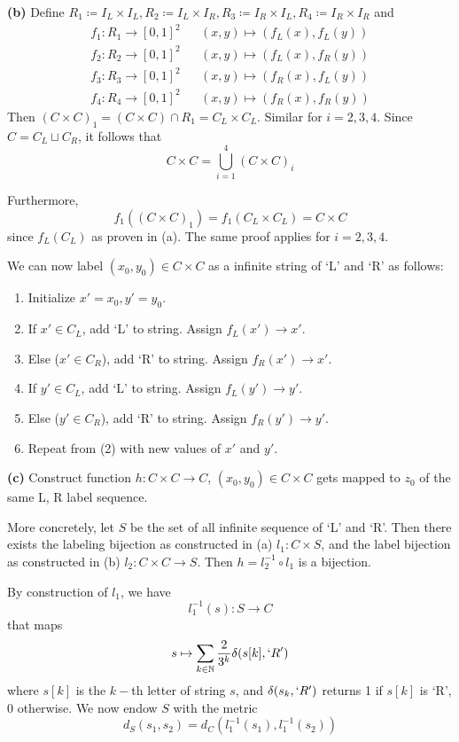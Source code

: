 \documentclass[a4paper, 12pt]{article}
\begin{document}
\begin{solution}
    \textbf{(b)} Define $R_1 \coloneqq I_L \times I_L, R_2 \coloneqq I_L \times I_R, R_3 \coloneqq I_R \times I_L, R_4 \coloneqq I_R \times I_R$ and
    \[
        \begin{aligned}
            f_1: R_1 \to [0, 1]^2 &  & (x, y) \mapsto (f_L(x), f_L(y)) \\
            f_2: R_2 \to [0, 1]^2 &  & (x, y) \mapsto (f_L(x), f_R(y)) \\
            f_3: R_3 \to [0, 1]^2 &  & (x, y) \mapsto (f_R(x), f_L(y)) \\
            f_4: R_4 \to [0, 1]^2 &  & (x, y) \mapsto (f_R(x), f_R(y))
        \end{aligned}
    \]
    Then $(C \times C)_1 = (C \times C) \cap R_1 = C_L \times C_L$. Similar for $i = 2, 3, 4$. Since $C = C_L \sqcup C_R$, it follows that \[
        C \times C = \bigcup_{i=1}^4 (C \times C)_i
    \]

    Furthermore, \[
        f_1 ((C \times C)_1) = f_1 (C_L \times C_L) = C \times C
    \]
    since $f_L(C_L)$ as proven in (a). The same proof applies for $i = 2, 3, 4$.

    We can now label $(x_0, y_0) \in C \times C$ as a infinite string of `L' and `R' as follows:
    \begin{enumerate}
        \item Initialize $x' = x_0, y' = y_0$.
        \item If $x' \in C_L$, add `L' to string. Assign $f_L(x') \to x'$.
        \item Else ($x' \in C_R$), add `R' to string. Assign $f_R(x') \to x'$.
        \item If $y' \in C_L$, add `L' to string. Assign $f_L(y') \to y'$.
        \item Else ($y' \in C_R$), add `R' to string. Assign $f_R(y') \to y'$.
        \item Repeat from (2) with new values of $x'$ and $y'$.
    \end{enumerate}

    \textbf{(c)} Construct function $h: C \times C \to C$, $(x_0, y_0) \in C \times C$ gets mapped to $z_0$ of the same L, R label sequence.

    More concretely, let $S$ be the set of all infinite sequence of `L' and `R'. Then there exists the labeling bijection as constructed in (a) $l_1: C \times S$, and the label bijection as constructed in (b) $l_2: C \times C \to S$. Then $h = l_2^{-1} \circ l_1$ is a bijection.

    By construction of $l_1$, we have \[
        l_1^{-1}(s): S \to C
    \]
    that maps \[
        s \mapsto \sum_{k \in \mathbb{N}} \frac{2}{3^k}\delta(s[k], `R')
    \]
    where $s[k]$ is the $k-$th letter of string $s$, and $\delta(s_k, `R')$ returns 1 if $s[k]$ is `R', 0 otherwise. We now endow $S$ with the metric \[
        d_S(s_1, s_2) = d_C(l_1^{-1}(s_1), l_1^{-1}(s_2))
    \]


\end{solution}
\end{document}

